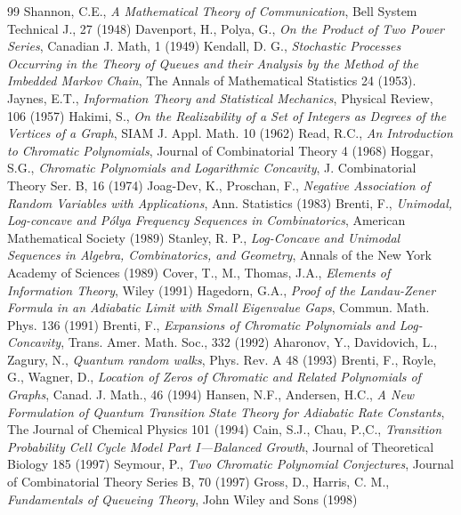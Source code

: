 \documentclass[a4paper,12pt]{article}
\begin{document}
\begin{thebibliography}{99}
 Shannon, C.E., \textit{A Mathematical Theory of Communication}, Bell System Technical J., 27 (1948)
 Davenport, H., Polya, G., \emph{On the Product of Two Power Series}, Canadian J. Math, 1 (1949)
 Kendall, D. G., \textit{Stochastic Processes Occurring in the Theory of Queues and their Analysis by the Method of the Imbedded Markov Chain}, The Annals of Mathematical Statistics 24 (1953).
 Jaynes, E.T., \textit{Information Theory and Statistical Mechanics}, Physical Review, 106 (1957)
 Hakimi, S., \textit{On the Realizability of a Set of Integers as Degrees of the Vertices of a Graph}, SIAM J. Appl. Math. 10 (1962)
 Read, R.C., \textit{An Introduction to Chromatic Polynomials}, Journal of Combinatorial Theory 4 (1968)
 Hoggar, S.G., \emph{Chromatic Polynomials and Logarithmic Concavity}, J. Combinatorial Theory Ser. B, 16 (1974)
 Joag-Dev, K., Proschan, F., \emph{Negative Association of Random Variables with Applications}, Ann. Statistics (1983)
 Brenti, F., \textit{Unimodal, Log-concave and Pólya Frequency Sequences in Combinatorics}, American Mathematical Society (1989)
 Stanley, R. P., \textit{Log-Concave and Unimodal Sequences in Algebra, Combinatorics, and Geometry}, Annals of the New York Academy of Sciences (1989)
 Cover, T., M., Thomas, J.A., \textit{Elements of Information Theory}, Wiley (1991)
 Hagedorn, G.A., \textit{Proof of the Landau-Zener Formula in an Adiabatic Limit with Small Eigenvalue Gaps}, Commun. Math. Phys. 136 (1991)
 Brenti, F., \textit{Expansions of Chromatic Polynomials and Log-Concavity}, Trans. Amer. Math. Soc., 332  (1992)
 Aharonov, Y., Davidovich, L., Zagury, N., \textit{Quantum random walks}, Phys. Rev. A 48 (1993)
 Brenti, F., Royle, G., Wagner, D., \textit{Location of Zeros of Chromatic and Related Polynomials of Graphs}, Canad. J. Math., 46 (1994)
 Hansen, N.F., Andersen, H.C., \textit{A New Formulation of Quantum Transition State Theory for Adiabatic Rate Constants}, The Journal of Chemical Physics 101 (1994)
 Cain, S.J., Chau, P.,C., \textit{Transition Probability Cell Cycle Model Part I—Balanced Growth}, Journal of Theoretical Biology 185 (1997)
 Seymour, P., \textit{Two Chromatic Polynomial Conjectures}, Journal of Combinatorial Theory Series B, 70 (1997)
 Gross, D., Harris, C. M., \textit{Fundamentals of Queueing Theory}, John Wiley and Sons (1998)

\end{thebibliography}
\end{document}
